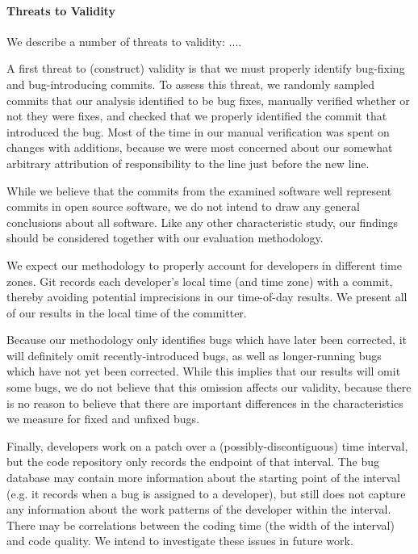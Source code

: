 \paragraph{Threats to Validity}
We describe a number of threats to validity: ....

A first threat to (construct) validity is that we must properly
identify bug-fixing and bug-introducing commits. To assess this
threat, we randomly sampled commits that our analysis identified to be
bug fixes, manually verified whether or not they were fixes, and
checked that we properly identified the commit that introduced the
bug. Most of the time in our manual verification was spent on changes
with additions, because we were most concerned about our somewhat
arbitrary attribution of responsibility to the line just before the
new line.



While we believe that the commits from the examined software well
represent commits in open source software, we do not intend to draw
any general conclusions about all software.  Like any other
characteristic study, our findings should be considered together with
our evaluation methodology.

We expect our methodology to properly account for developers in
different time zones. Git records each developer's local time (and
time zone) with a commit, thereby avoiding potential imprecisions in
our time-of-day results. We present all of our results in the local
time of the committer.


Because our methodology only identifies bugs which have later been
corrected, it will definitely omit recently-introduced bugs, as well
as longer-running bugs which have not yet been corrected. While this
implies that our results will omit some bugs, we do not believe that
this omission affects our validity, because there is no reason to
believe that there are important differences in the characteristics we
measure for fixed and unfixed bugs.

Finally, developers work on a patch over a (possibly-discontiguous)
time interval, but the code repository only records the endpoint of
that interval. The bug database may contain more information about the
starting point of the interval (e.g. it records when a bug is assigned
to a developer), but still does not capture any information about the
work patterns of the developer within the interval. There may be
correlations between the coding time (the width of the interval) and
code quality. We intend to investigate these issues in future work.


